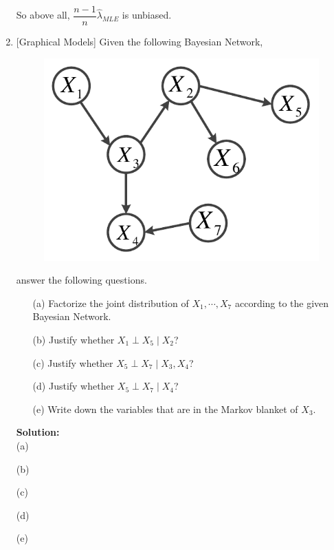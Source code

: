 \documentclass[10pt]{article}
\begin{document}
\begin{enumerate}[1.]
		  So above all, $\dfrac{n-1}{n}\hat{\lambda}_{MLE}$ is unbiased.\\
		  
      	  \newpage

	\item {} [Graphical Models]
	Given the following Bayesian Network, 
	\begin{figure}[h]
		\label{fig:bn}
		\vskip 0.2in
		\begin{center}
		\centerline{\includegraphics[width=0.4\columnwidth]{figures/bn}}
		\end{center}
		\vskip -0.2in
	\end{figure}

	answer the following questions.
		\begin{itemize}
			\item[(a)] Factorize the joint distribution of $X_{1},\cdots,X_{7}$ according 
			to the given Bayesian Network.~ 
			\item[(b)] Justify whether $X_{1}\perp X_{5}\mid X_{2}$?~ 
			\item[(c)] Justify whether $X_{5}\perp X_{7}\mid X_{3},X_{4}$?~ 
			\item[(d)] Justify whether $X_{5}\perp X_{7}\mid X_{4}$?~ 
			\item[(e)] Write down the variables that are in the Markov blanket of $X_{3}$.~ 
		\end{itemize}

		\textbf{Solution:}\\
		(a)




		(b)




		(c)



		(d)




		(e)

		



\end{enumerate}
\end{document}
